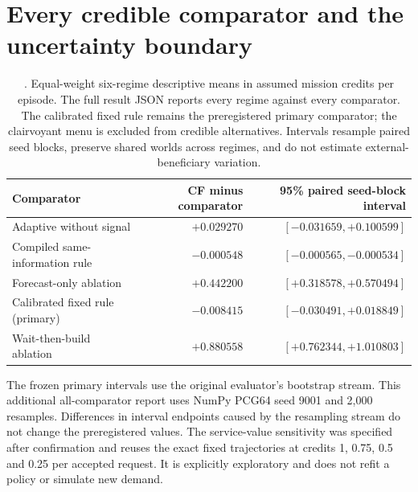 \section{Every credible comparator and the uncertainty boundary}\label{app:comparisons}
\begin{table}[ht]\centering\small
\begin{tabular}{@{}lrr@{}}\toprule
Comparator & CF minus comparator & 95\% paired seed-block interval\\\midrule
Adaptive without signal & $+0.029270$ & $[-0.031659,+0.100599]$\\
Compiled same-information rule & $-0.000548$ & $[-0.000565,-0.000534]$\\
Forecast-only ablation & $+0.442200$ & $[+0.318578,+0.570494]$\\
Calibrated fixed rule (primary) & $-0.008415$ & $[-0.030491,+0.018849]$\\
Wait-then-build ablation & $+0.880558$ & $[+0.762344,+1.010803]$\\
\bottomrule\end{tabular}
\caption{\simu{}. Equal-weight six-regime descriptive means in assumed mission credits per episode. The full result JSON reports every regime against every comparator. The calibrated fixed rule remains the preregistered primary comparator; the clairvoyant menu is excluded from credible alternatives. Intervals resample paired seed blocks, preserve shared worlds across regimes, and do not estimate external-beneficiary variation.}\end{table}

The frozen primary intervals use the original evaluator's bootstrap stream. This additional all-comparator report uses NumPy PCG64 seed 9001 and 2,000 resamples. Differences in interval endpoints caused by the resampling stream do not change the preregistered values. The service-value sensitivity was specified after confirmation and reuses the exact fixed trajectories at credits 1, 0.75, 0.5 and 0.25 per accepted request. It is explicitly exploratory and does not refit a policy or simulate new demand.
